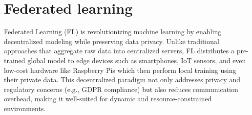 \pagebreak


\section{Federated learning}

Federated Learning (FL) is revolutionizing machine learning by enabling decentralized modeling while preserving data privacy. Unlike traditional approaches that aggregate raw data into centralized servers, FL distributes a pre-trained global model to edge devices  such as smartphones, IoT sensors, and even low-cost hardware like Raspberry Pis  which then perform local training using their private data. This decentralized paradigm not only addresses privacy and regulatory concerns (e.g., GDPR compliance) but also reduces communication overhead, making it well-suited for dynamic and resource-constrained environments.


    

